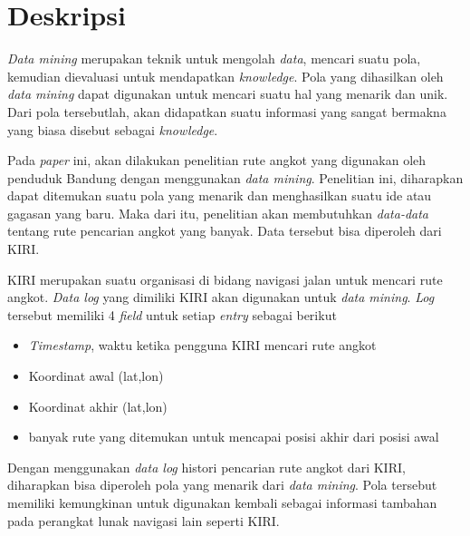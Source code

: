 \documentclass[a4paper,twoside]{article}
\begin{document}
\title{\@judultopik}
\author{\nama \textendash \@npm} 

\newcommand{\nama}{Jovan Gunawan}
\newcommand{\@npm}{2011730029}
\newcommand{\@judultopik}{\textsl{Data Mining} Histori Pencarian Rute Angkot} %
\newcommand{\jumpemb}{1} %
\newcommand{\tanggal}{7/06/2014}
\maketitle


\section{Deskripsi}
\textsl{Data mining} merupakan teknik untuk mengolah \textsl{data}, mencari suatu pola, kemudian dievaluasi untuk mendapatkan \textsl{knowledge}. Pola yang dihasilkan oleh \textsl{data mining} dapat digunakan untuk mencari suatu hal yang menarik dan unik. Dari pola tersebutlah, akan didapatkan suatu informasi yang sangat bermakna yang biasa disebut sebagai \textsl{knowledge}.

Pada \textsl{paper} ini, akan dilakukan penelitian rute angkot yang digunakan oleh penduduk Bandung dengan menggunakan \textsl{data mining}. Penelitian ini, diharapkan dapat ditemukan suatu pola yang menarik dan menghasilkan suatu ide atau gagasan yang baru. Maka dari itu, penelitian akan membutuhkan \textsl{data-data} tentang rute pencarian angkot yang banyak. Data tersebut bisa diperoleh dari KIRI.

KIRI merupakan suatu organisasi di bidang navigasi jalan untuk mencari rute angkot. \textsl{Data log} yang dimiliki KIRI akan digunakan untuk \textsl{data mining}. \textsl{Log} tersebut memiliki 4 \textsl{field} untuk setiap \textsl{entry} sebagai berikut
\begin{itemize}
	\item \textsl{Timestamp}, waktu ketika pengguna KIRI mencari rute angkot
	\item Koordinat awal (lat,lon)
	\item Koordinat akhir (lat,lon)
	\item banyak rute yang ditemukan untuk mencapai posisi akhir dari posisi awal
\end{itemize}

Dengan menggunakan \textsl{data log} histori pencarian rute angkot dari KIRI, diharapkan bisa diperoleh pola yang menarik dari \textsl{data mining}. Pola tersebut memiliki kemungkinan untuk digunakan kembali sebagai informasi tambahan pada perangkat lunak navigasi lain seperti KIRI.
\end{document}
